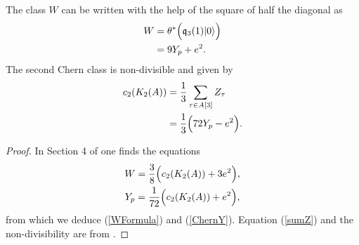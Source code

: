 \begin{proposition}
The class $W$ can be written with the help of the square of half the diagonal as
\begin{align} 
W &= \theta^*\Big( \mathfrak{q}_3(1)|0\rangle \Big) \\
\label{WFormula}
&= 9 Y_p + e^2.
\end{align}
The second Chern class is non-divisible and given by 
\begin{align}
\label{sumZ}
c_2(K_{ 2 }( A )) &= \frac{1}{3}\sum_{\tau\in A[3] } Z_\tau \\
\label{ChernY}
&= \frac{1}{3} \Big(72Y_p-e^2 \Big). 
\end{align}
\end{proposition}
\begin{proof} 
In Section 4 of \cite{Hassett} one finds the equations
\begin{gather}
W = \frac{3}{8}\Big(c_2(K_{ 2 }( A )) + 3e^2\Big),\label{WW} \\
Y_p = \frac{1}{72}\Big(c_2(K_{ 2 }( A )) + e^2\Big),
\end{gather}
from which we deduce (\ref{WFormula}) and (\ref{ChernY}).
Equation (\ref{sumZ}) and the non-divisibility are from \cite[Proposition 5.1]{Hassett}.
\end{proof}


